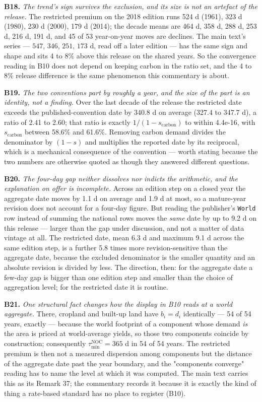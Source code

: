 \documentclass[11pt]{article}
\begin{document}
\textbf{B18.} \emph{The trend's sign survives the exclusion, and its size is not an artefact of the release.} The restricted premium on the 2018 edition runs 524 d (1961), 323 d (1980), 230 d (2000), 179 d (2014); the decade means are 464 d, 358 d, 288 d, 253 d, 216 d, 191 d, and 45 of 53 year-on-year moves are declines. The main text's series --- \(547\), \(346\), \(251\), \(173\) d, read off a later edition --- has the same sign and shape and sits 4 to 8\% above this release on the shared years. So the convergence reading in B10 does not depend on keeping carbon in the ratio set, and the 4 to 8\% release difference is the same phenomenon this commentary is about.

\textbf{B19.} \emph{The two conventions part by roughly a year, and the size of the part is an identity, not a finding.} Over the last decade of the release the restricted date exceeds the published-convention date by 340.8 d on average (327.4 to 347.7 d), a ratio of 2.41 to 2.60; that ratio is exactly \(1/(1-s_{\mathrm{carbon}})\) to within 4.4e-16, with \(s_{\mathrm{carbon}}\) between 58.6\% and 61.6\%. Removing carbon demand divides the denominator by \((1-s)\) and multiplies the reported date by its reciprocal, which is a mechanical consequence of the convention --- worth stating because the two numbers are otherwise quoted as though they answered different questions.

\textbf{B20.} \emph{The four-day gap neither dissolves nor indicts the arithmetic, and the explanation on offer is incomplete.} Across an edition step on a closed year the aggregate date moves by 1.1 d on average and 1.9 d at most, so a mature-year revision does not account for a four-day figure. But reading the publisher's \texttt{World} row instead of summing the national rows moves the \emph{same} date by up to 9.2 d on this release --- larger than the gap under discussion, and not a matter of data vintage at all. The restricted date, mean 6.3 d and maximum 9.1 d across the same edition step, is a further 5.8 times more revision-sensitive than the aggregate date, because the excluded denominator is the smaller quantity and an absolute revision is divided by less. The direction, then: for the aggregate date a few-day gap is bigger than one edition step and smaller than the choice of aggregation level; for the restricted date it is routine.

\textbf{B21.} \emph{One structural fact changes how the display in B10 reads at a world aggregate.} There, cropland and built-up land have \(b_i = d_i\) identically --- 54 of 54 years, exactly --- because the world footprint of a component whose demand \emph{is} the area is priced at world-average yields, so those two components coincide by construction; consequently \(\tau_{\min}^{\mathrm{NOC}} = 365\) d in 54 of 54 years. The restricted premium is then not a measured dispersion among components but the distance of the aggregate date past the year boundary, and the "components converge" reading has to name the level at which it was computed. The main text carries this as its Remark 37; the commentary records it because it is exactly the kind of thing a rate-based standard has no place to register (B10).
\end{document}
